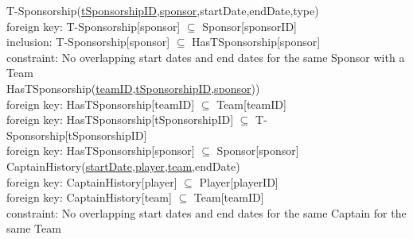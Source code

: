 \pagebreak

{\color{ForestGreen}T-Sponsorship(\underline{tSponsorshipID},\underline{sponsor},startDate,endDate,type)}\\
{\color{Orange}\hspace{2mm} foreign key: {\color{Magenta}T-Sponsorship[sponsor] $\subseteq$ Sponsor[sponsorID]}} \\
{\color{Orange}\hspace{2mm} inclusion: {\color{Magenta}T-Sponsorship[sponsor] $\subseteq$ HasTSponsorship[sponsor]}} \\
{\color{Orange}\hspace{2mm} constraint: {\color{Magenta}No overlapping start dates and end dates for the same Sponsor with a Team}} \\

{\color{ForestGreen}HasTSponsorship(\underline{teamID},\underline{tSponsorshipID},\underline{sponsor}))}\\
{\color{Orange}\hspace{2mm} foreign key: {\color{Magenta}HasTSponsorship[teamID] $\subseteq$ Team[teamID]}} \\
{\color{Orange}\hspace{2mm} foreign key: {\color{Magenta}HasTSponsorship[tSponsorshipID] $\subseteq$ T-Sponsorship[tSponsorshipID]}} \\
{\color{Orange}\hspace{2mm} foreign key: {\color{Magenta}HasTSponsorship[sponsor] $\subseteq$ Sponsor[sponsor]}} \\

{\color{ForestGreen}CaptainHistory(\underline{startDate},\underline{player},\underline{team},endDate)}\\
{\color{Orange}\hspace{2mm} foreign key: {\color{Magenta}CaptainHistory[player] $\subseteq$ Player[playerID]}} \\
{\color{Orange}\hspace{2mm} foreign key: {\color{Magenta}CaptainHistory[team] $\subseteq$ Team[teamID]}} \\
{\color{Orange}\hspace{2mm} constraint: {\color{Magenta}No overlapping start dates and end dates for the same Captain for the same Team}} \\

